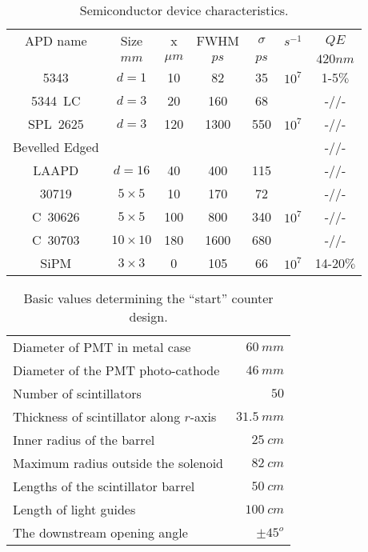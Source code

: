\begin{table}[ht]
\begin{center}
\begin{tabular}{|c|c|c|c|c|c|c|} \hline
  APD name      &Size      & x         &FWHM     &$\sigma $& $s^{-1}$&  $QE$    \\ 
                &   $mm$  & $\mu m$   & $ps$    &    $ps$ &         &     $420nm$              \\ \hline
  5343          & $d=1$    & 10        & 82  & 35          & $10^7$        & 1-5$\%$          \\ \hline
  5344~LC       & $d=3$    & 20        & 160 & 68          &               & -//-             \\ \hline
  SPL~2625      & $d=3$    & 120       & 1300& 550         & $10^7$        & -//-             \\ \hline
  Bevelled Edged&          &           &     &             &               & -//-              \\
  LAAPD& $d=16$ & 40       & 400       & 115 & & -//-                                            \\\hline
  30719& $5\times5$ & 10 & 170&72 & & -//-\\ \hline
  C~30626& $5\times5$ & 100 & 800& 340&$10^7$& -//- \\ \hline

C~30703& $10\times10$ & 180 & 1600&680 & & -//-\\ \hline
SiPM& $3 \times 3 $ & 0 & 105&66 &$10^7$ & 14-20$\%$\\ \hline
\end{tabular}
\caption{Semiconductor device characteristics.\label{apd}}                                                      
\end{center}
\end{table}


\begin{table}[htbp]
\begin{center}
\begin{tabular}{|l|r|} \hline
Diameter of PMT in metal case & $60~mm$\\
Diameter of the PMT photo-cathode & $46~mm$\\
Number of scintillators & $50$\\
Thickness of scintillator  along  $r$-axis & $31.5~mm$\\
Inner radius of the  barrel & $25~cm$\\
Maximum radius outside the solenoid & $82~cm$\\
Lengths of the scintillator barrel & $50~cm$\\
Length of light guides & $100~cm$\\
The downstream opening angle & $\pm 45^o$ \\\hline
\end{tabular}
\caption{Basic values determining  the ``start'' counter design.\label{basval}}
\end{center}
\end{table}

